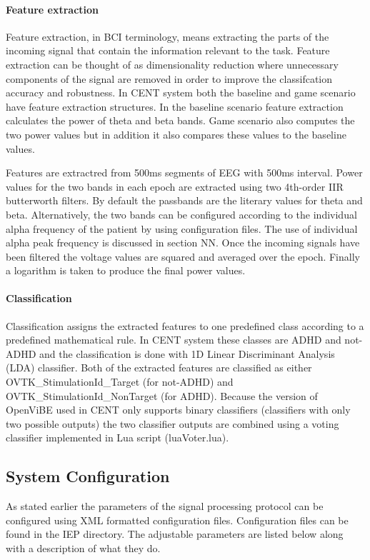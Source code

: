 \paragraph{Feature extraction}
Feature extraction, in BCI terminology, means extracting the parts of the incoming signal that contain the information relevant to the task. Feature extraction can be thought of as dimensionality reduction where unnecessary components of the signal are removed in order to improve the classifcation accuracy and robustness. In CENT system both the baseline and game scenario have feature extraction structures. In the baseline scenario feature extraction calculates the power of theta and beta bands. Game scenario also computes the two power values but in addition it also compares these values to the baseline values.

Features are extractred from 500ms segments of EEG with 500ms interval. Power values for the two bands in each epoch are extracted using two 4th-order IIR butterworth filters. By default the passbands are the literary values for theta and beta. Alternatively, the two bands can be configured according to the individual alpha frequency of the patient by using configuration files. The use of individual alpha peak frequency is discussed in section NN. Once the incoming signals have been filtered the voltage values are squared and averaged over the epoch. Finally a logarithm is taken to produce the final power values.  

\paragraph{Classification}
Classification assigns the extracted features to one predefined class according to a predefined mathematical rule. In CENT system these classes are ADHD and not-ADHD and the classification is done with 1D Linear Discriminant Analysis (LDA) classifier. Both of the extracted features are classified as either OVTK\_StimulationId\_Target (for not-ADHD) and OVTK\_StimulationId\_NonTarget (for ADHD). Because the version of OpenViBE used in CENT only supports binary classifiers (classifiers with only two possible outputs) the two classifier outputs are combined using a voting classifier implemented in Lua script (luaVoter.lua). 

\subsection{System Configuration}
As stated earlier the parameters of the signal processing protocol can be configured using XML formatted configuration files. Configuration files can be found in the IEP directory. The adjustable parameters are listed below along with a description of what they do.

